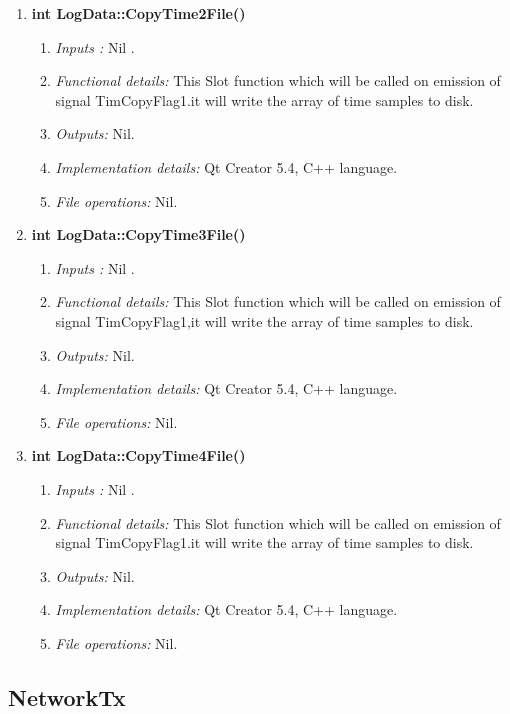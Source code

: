 \begin{enumerate}
\begin{enumerate}
	\item  \textbf{int LogData::CopyTime2File()}
	\begin{enumerate}
		\item \textit{Inputs :} Nil .
		\item \textit{Functional details:} This Slot function which will be called on emission of signal TimCopyFlag1.it will write the array of time samples to disk.
		\item \textit{Outputs:} Nil.
		\item \textit{Implementation details:} Qt Creator 5.4, C++ language.
		\item \textit{File operations:} Nil.
	\end{enumerate}
	
	\item  \textbf{int LogData::CopyTime3File()}
	\begin{enumerate}
		\item \textit{Inputs :} Nil .
		\item \textit{Functional details:} This Slot function which will be called on emission of signal TimCopyFlag1,it will write the array of time samples to disk.
		\item \textit{Outputs:} Nil.
		\item \textit{Implementation details:} Qt Creator 5.4, C++ language.
		\item \textit{File operations:} Nil.
	\end{enumerate}
	\item  \textbf{int LogData::CopyTime4File()}
	\begin{enumerate}
		\item \textit{Inputs :} Nil .
		\item \textit{Functional details:} This Slot function which will be called on emission of signal TimCopyFlag1.it will write the array of time samples to disk.
		\item \textit{Outputs:} Nil.
		\item \textit{Implementation details:} Qt Creator 5.4, C++ language.
		\item \textit{File operations:} Nil.
	\end{enumerate}
	
\end{enumerate}


\subsection{NetworkTx}



\end{enumerate}
